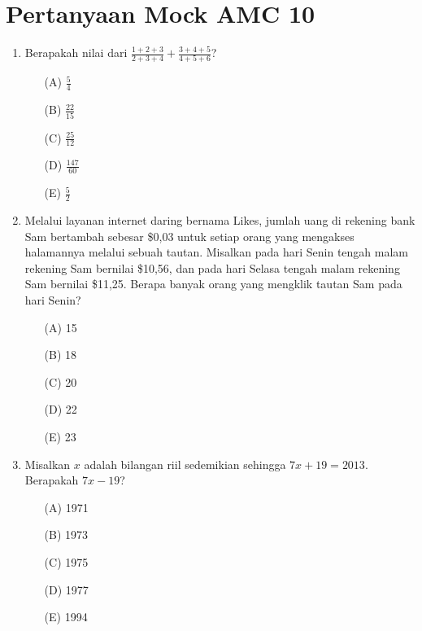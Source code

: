 \documentclass[12pt]{scrartcl}
\begin{document}
\renewcommand*\contentsname{Daftar Isi}
\tableofcontents

\newpage

\section*{Pertanyaan Mock AMC 10}

\begin{enumerate}
    \item Berapakah nilai dari $\frac{1+2+3}{2+3+4}+\frac{3+4+5}{4+5+6}$?
    \begin{itemize}
        \item[(A)] $\frac{5}{4}$
        \item[(B)] $\frac{22}{15}$
        \item[(C)] $\frac{25}{12}$
        \item[(D)] $\frac{147}{60}$
        \item[(E)] $\frac{5}{2}$
    \end{itemize}

    \item Melalui layanan internet daring bernama Likes, jumlah uang di rekening bank Sam bertambah sebesar \$0,03 untuk setiap orang yang mengakses halamannya melalui sebuah tautan. Misalkan pada hari Senin tengah malam rekening Sam bernilai \$10,56, dan pada hari Selasa tengah malam rekening Sam bernilai \$11,25. Berapa banyak orang yang mengklik tautan Sam pada hari Senin?
    \begin{itemize}
        \item[(A)] 15
        \item[(B)] 18
        \item[(C)] 20
        \item[(D)] 22
        \item[(E)] 23
    \end{itemize}

    \item Misalkan $x$ adalah bilangan riil sedemikian sehingga $7x+19=2013$. Berapakah $7x-19$?
    \begin{itemize}
        \item[(A)] 1971
        \item[(B)] 1973
        \item[(C)] 1975
        \item[(D)] 1977
        \item[(E)] 1994
    \end{itemize}


\end{enumerate}
\end{document}
